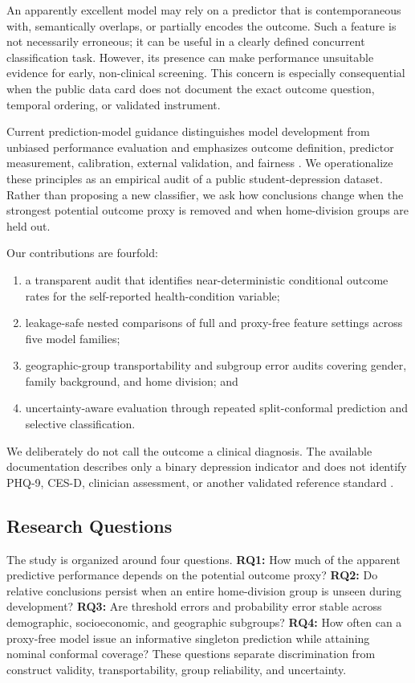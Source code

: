 \documentclass[conference]{IEEEtran}
\begin{document}
An apparently excellent model may rely on a predictor that is contemporaneous with, semantically overlaps, or partially encodes the outcome. Such a feature is not necessarily erroneous; it can be useful in a clearly defined concurrent classification task. However, its presence can make performance unsuitable evidence for early, non-clinical screening. This concern is especially consequential when the public data card does not document the exact outcome question, temporal ordering, or validated instrument.

Current prediction-model guidance distinguishes model development from unbiased performance evaluation and emphasizes outcome definition, predictor measurement, calibration, external validation, and fairness \cite{collins2024tripod,moons2025probast}. We operationalize these principles as an empirical audit of a public student-depression dataset. Rather than proposing a new classifier, we ask how conclusions change when the strongest potential outcome proxy is removed and when home-division groups are held out.

Our contributions are fourfold:
\begin{enumerate}
    \item a transparent audit that identifies near-deterministic conditional outcome rates for the self-reported health-condition variable;
    \item leakage-safe nested comparisons of full and proxy-free feature settings across five model families;
    \item geographic-group transportability and subgroup error audits covering gender, family background, and home division; and
    \item uncertainty-aware evaluation through repeated split-conformal prediction and selective classification.
\end{enumerate}

We deliberately do not call the outcome a clinical diagnosis. The available documentation describes only a binary depression indicator and does not identify PHQ-9, CES-D, clinician assessment, or another validated reference standard \cite{haque2026dataset}.

\subsection{Research Questions}
The study is organized around four questions. \textbf{RQ1:} How much of the apparent predictive performance depends on the potential outcome proxy? \textbf{RQ2:} Do relative conclusions persist when an entire home-division group is unseen during development? \textbf{RQ3:} Are threshold errors and probability error stable across demographic, socioeconomic, and geographic subgroups? \textbf{RQ4:} How often can a proxy-free model issue an informative singleton prediction while attaining nominal conformal coverage? These questions separate discrimination from construct validity, transportability, group reliability, and uncertainty.
\end{document}
